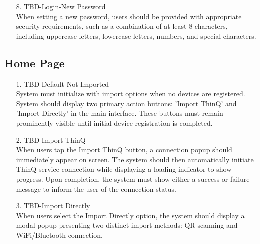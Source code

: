 \documentclass[conference]{IEEEtran}
\begin{document}
\begin{enumerate}
\begin{itemize}
\begin{itemize}
    \begin{enumerate}
        \item[8.] TBD-Login-New Password \\
        When setting a new password, users should be provided with appropriate security requirements, such as a combination of at least 8 characters, including uppercase letters, lowercase letters, numbers, and special characters. \\
    \end{enumerate}
    
    

\subsection{Home Page}

    \begin{enumerate}
        \item[1.] TBD-Default-Not Imported \\
        System must initialize with import options when no devices are registered. System should display two primary action buttons: 'Import ThinQ' and 'Import Directly' in the main interface. These buttons must remain prominently visible until initial device registration is completed. \\
    \end{enumerate}

    \begin{enumerate}
        \item[2.] TBD-Import ThinQ \\
        When users tap the Import ThinQ button, a connection popup should immediately appear on screen. The system should then automatically initiate ThinQ service connection while displaying a loading indicator to show progress. Upon completion, the system must show either a success or failure message to inform the user of the connection status. \\
    \end{enumerate}
    
    \begin{enumerate}
        \item[3.] TBD-Import Directly \\
        When users select the Import Directly option, the system should display a modal popup presenting two distinct import methods: QR scanning and WiFi/Bluetooth connection.  \\
    \end{enumerate}
    

\end{itemize}
\end{itemize}
\end{enumerate}
\end{document}
